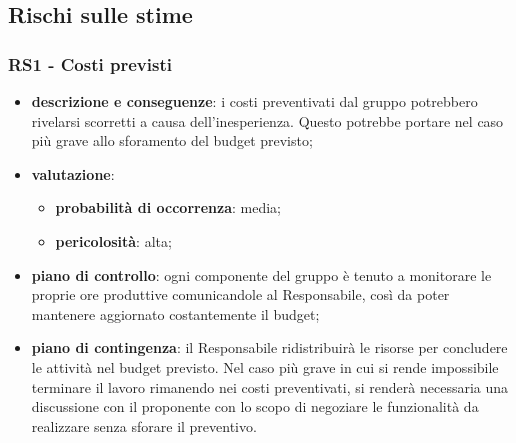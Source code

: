 \subsection{Rischi sulle stime} %

    \subsubsection{RS1 - Costi previsti} \label{sec:RS1}
        \begin{itemize}
            \item \textbf{descrizione e conseguenze}: i costi preventivati dal gruppo potrebbero rivelarsi scorretti a causa dell'inesperienza. Questo potrebbe portare nel caso più grave allo sforamento del budget previsto;
            \item \textbf{valutazione}:
            \begin{itemize} 
                \item \textbf{probabilità di occorrenza}: media;
                \item \textbf{pericolosità}: alta;
            \end{itemize}
            \item \textbf{piano di controllo}: ogni componente del gruppo è tenuto a monitorare le proprie ore produttive comunicandole al Responsabile, così da poter mantenere aggiornato costantemente il budget;
            \item \textbf{piano di contingenza}: il Responsabile ridistribuirà le risorse per concludere le attività nel budget previsto. Nel caso più grave in cui si rende impossibile terminare il lavoro rimanendo nei costi preventivati, si renderà necessaria una discussione con il proponente con lo scopo di negoziare le funzionalità da realizzare senza sforare il preventivo.
        \end{itemize}
    
